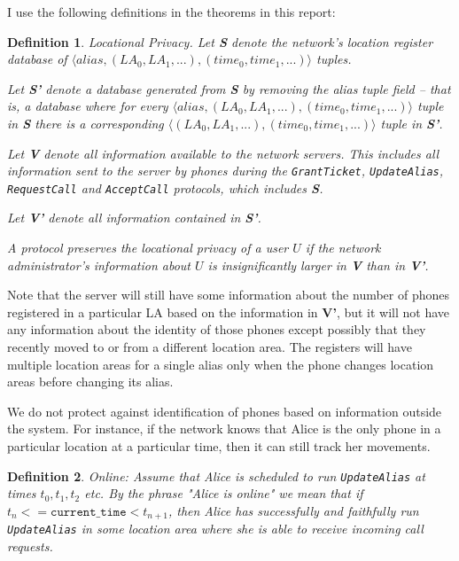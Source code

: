 \documentclass[11pt]{article}
\newtheorem{mydef}{Definition}
\begin{document}
I use the following definitions in the theorems in this report:
\begin{mydef}Locational Privacy.
	Let \textbf{S} denote the network's location register database of $\langle alias, (LA_0, LA_1, ...), (time_0, time_1, ...) \rangle$ tuples.

	Let \textbf{S'} denote a database generated from \textbf{S} by removing the alias tuple field -- that is, a database where for every $\langle alias, (LA_0, LA_1, ...), (time_0, time_1, ...)\rangle$ tuple in \textbf{S} there is a corresponding $\langle(LA_0, LA_1, ...), (time_0, time_1, ...)\rangle$ tuple in \textbf{S'}.

	Let \textbf{V} denote all information available to the network servers. This includes all information sent to the server by phones during the \emph{\texttt{GrantTicket}, \texttt{UpdateAlias}, \texttt{RequestCall}} and \emph{\texttt{AcceptCall}} protocols, which includes \textbf{S}.

	Let \textbf{V'} denote all information contained in \textbf{S'}.

	A protocol preserves the \emph{locational privacy} of a user $U$ if the network administrator's information about $U$ is insignificantly larger in \textbf{V} than in \textbf{V'}.
\end{mydef}

Note that the server will still have some information about the number of phones registered in a particular LA based on the information in \textbf{V'}, but it will not have any information about the identity of those phones except possibly that they recently moved to or from a different location area. The registers will have multiple location areas for a single alias only when the phone changes location areas before changing its alias. 

We do not protect against identification of phones based on information outside the system. For instance, if the network knows that Alice is the only phone in a particular location at a particular time, then it can still track her movements.

\begin{mydef} Online: Assume that Alice is scheduled to run \emph{\texttt{UpdateAlias}} at times $t_0, t_1, t_2$ etc. By the phrase \emph{"Alice is online"} we mean that if $t_n <= \texttt{current_time} < t_{n+1}$, then Alice has successfully and faithfully run \emph{\texttt{UpdateAlias}} in some location area where she is able to receive incoming call requests.
\end{mydef}
\end{document}
